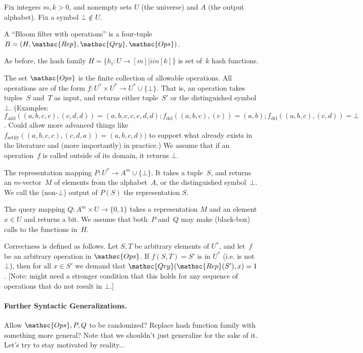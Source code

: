 
Fix integers $m,k > 0$, and nonempty sets $U$ (the universe) and $A$ (the output alphabet).  Fix a symbol $\bot \not\in U$.  

A “Bloom filter with operations” is a four-tuple  $B=(H,\mathsc{Rep},\mathsc{Qry}, \mathsc{Ops})$.  

As before, the hash family $H = \{h_i : U \rightarrow [m]  | i in [k] \}$ is  set of~$k$ hash functions.  

The set $\mathsc{Ops}$ is the finite collection of allowable operations.  All operations are of the form 
$f: U^* \times U^* \rightarrow U^* \cup \{\bot\}$.  That is, an operation takes tuples~$S$ and~$T$ as input, and returns either tuple~$S'$ or the distinguished symbol $\bot$.  (Examples: $f_{\mathrm{add}}((a,b,c,c),(c,d,d)) = (a,b,c,c,c,d,d); f_{\mathrm{del}}((a,b,c),(c))=(a,b); f_{\mathrm{del}}((a,b,c),(c,d)) = \bot$.  Could allow more advanced things like $f_{\mathrm{setify}}((a,b,c,c),(c,d,a)) = (a,b,c,d))$ to support what already exists in the literature and (more importantly) in practice.)  We assume that if an operation~$f$ is called outside of its domain, it returns $\bot$.

The representation mapping $P: U^* \rightarrow A^m \cup \{\bot\}$.  It takes a tuple~$S$, and returns an $m$-vector~$M$ of elements from the alphabet~$A$, or the distinguished symbol~$\bot$.  We call the (non-$\bot$) output of $P(S)$ the representation $S$. 

The query mapping $Q: A^m \times U \rightarrow \{0,1\}$ takes a representation $M$ and an element $x \in U$ and returns a bit.  We assume that both~$P$ and~$Q$ may make (black-box) calls to the functions in~$H$.  

Correctness is defined as follows.  Let $S,T$ be arbitrary elements of $U^*$, and let~$f$ be an arbitrary operation in $\mathsc{Ops}$.  If $f(S,T) = S'$ is in $U^*$ (i.e. is not $\bot$), then for all $x \in S'$ we demand that $\mathsc{Qry}(\mathsc{Rep}(S'),x)=1$. [Note: might need a stronger condition that this holds for any sequence of operations that do not result in $\bot$.]

\paragraph{Further Syntactic Generalizations. }

Allow $\mathsc{Ops}, P, Q$ to be randomized?  Replace hash function family with something more general?  Note that we shouldn't just generalize for the sake of it.  Let's try to stay motivated by reality...

